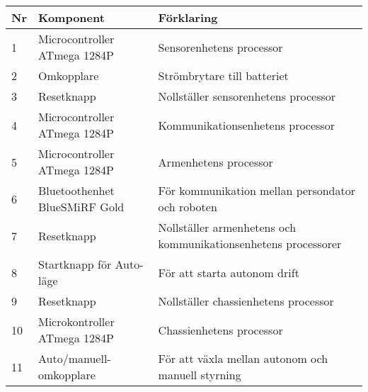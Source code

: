\begin{center}
    \begin{tabular}{| l | l | l |}
    \hline
   \textbf{Nr} &  \textbf{Komponent} &  \textbf{Förklaring} \\ \hline
    1 & Microcontroller ATmega 1284P & Sensorenhetens processor \\ \hline
 2 & Omkopplare & Strömbrytare till batteriet \\ \hline
 3 & Resetknapp & Nollställer sensorenhetens processor \\ \hline
 4 & Microcontroller ATmega 1284P & Kommunikationsenhetens processor \\ \hline
 5 & Microcontroller ATmega 1284P & Armenhetens processor \\ \hline
 6 & Bluetoothenhet BlueSMiRF Gold &  För kommunikation mellan persondator och roboten\\ \hline
 7 & Resetknapp & Nollställer armenhetens och kommunikationsenhetens processorer \\ \hline
 8 & Startknapp för Auto-läge & För att starta autonom drift \\ \hline
9 & Resetknapp & Nollställer chassienhetens processor \\ \hline
10 & Microkontroller ATmega 1284P & Chassienhetens processor \\ \hline
11 & Auto/manuell-omkopplare & För att växla mellan autonom och manuell styrning \\ \hline
    \end{tabular}
\end{center}
